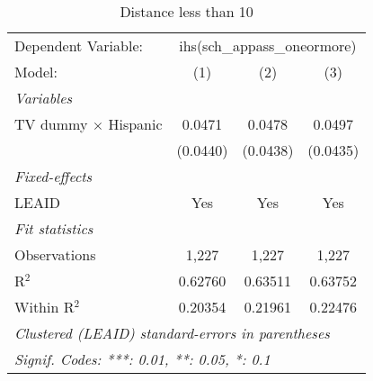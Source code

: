 \begin{table}[htbp]
\centering
\caption{Distance less than 10}
\begin{tabular}{lccc}
\tabularnewline\midrule\midrule
Dependent Variable:&\multicolumn{3}{c}{ihs(sch\_appass\_oneormore)}\\
Model:&(1) & (2) & (3)\\
\midrule \emph{Variables}&   &   &  \\
TV dummy $\times$ Hispanic & 0.0471 & 0.0478 & 0.0497\\
  &(0.0440) & (0.0438) & (0.0435)\\
\midrule \emph{Fixed-effects}&   &   &  \\
LEAID & Yes & Yes & Yes\\
\midrule \emph{Fit statistics}&  & & \\
Observations & 1,227&1,227&1,227\\
R$^2$ & 0.62760&0.63511&0.63752\\
Within R$^2$ & 0.20354&0.21961&0.22476\\
\midrule\midrule\multicolumn{4}{l}{\emph{Clustered (LEAID) standard-errors in parentheses}}\\
\multicolumn{4}{l}{\emph{Signif. Codes: ***: 0.01, **: 0.05, *: 0.1}}\\
\end{tabular}
\end{table}


